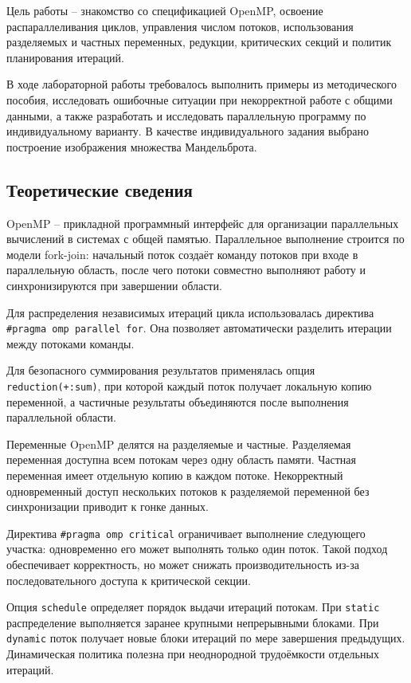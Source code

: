 \documentclass[12pt,a4paper]{article}
\begin{document}
Цель работы -- знакомство со спецификацией OpenMP, освоение распараллеливания циклов, управления числом потоков, использования разделяемых и частных переменных, редукции, критических секций и политик планирования итераций.

В ходе лабораторной работы требовалось выполнить примеры из методического пособия, исследовать ошибочные ситуации при некорректной работе с общими данными, а также разработать и исследовать параллельную программу по индивидуальному варианту. В качестве индивидуального задания выбрано построение изображения множества Мандельброта.

\subsection{Теоретические сведения}

OpenMP -- прикладной программный интерфейс для организации параллельных вычислений в системах с общей памятью. Параллельное выполнение строится по модели fork-join: начальный поток создаёт команду потоков при входе в параллельную область, после чего потоки совместно выполняют работу и синхронизируются при завершении области.

Для распределения независимых итераций цикла использовалась директива \texttt{\#pragma omp parallel for}. Она позволяет автоматически разделить итерации между потоками команды.

Для безопасного суммирования результатов применялась опция \texttt{reduction(+:sum)}, при которой каждый поток получает локальную копию переменной, а частичные результаты объединяются после выполнения параллельной области.

Переменные OpenMP делятся на разделяемые и частные. Разделяемая переменная доступна всем потокам через одну область памяти. Частная переменная имеет отдельную копию в каждом потоке. Некорректный одновременный доступ нескольких потоков к разделяемой переменной без синхронизации приводит к гонке данных.

Директива \texttt{\#pragma omp critical} ограничивает выполнение следующего участка: одновременно его может выполнять только один поток. Такой подход обеспечивает корректность, но может снижать производительность из-за последовательного доступа к критической секции.

Опция \texttt{schedule} определяет порядок выдачи итераций потокам. При \texttt{static} распределение выполняется заранее крупными непрерывными блоками. При \texttt{dynamic} поток получает новые блоки итераций по мере завершения предыдущих. Динамическая политика полезна при неоднородной трудоёмкости отдельных итераций.
\end{document}
